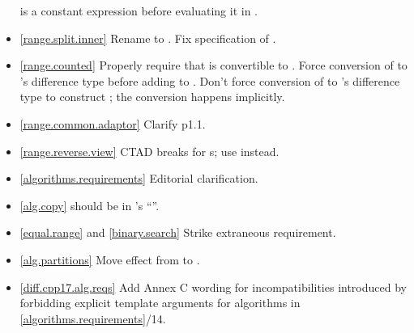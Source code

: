 \begin{itemize}
  is a constant expression before evaluating it in
  .
\item \ref{range.split.inner} Rename  to .
  Fix specification of .
\item \ref{range.counted}
  Properly require that  is convertible to .
  Force conversion of  to 's difference type
  before adding to .
  Don't force conversion of  to 's difference type to
  construct ; the conversion happens implicitly.
\item \ref{range.common.adaptor} Clarify p1.1.
\item \ref{range.reverse.view}  CTAD breaks for
  s; use  instead.
\item \ref{algorithms.requirements} Editorial clarification.
\item \ref{alg.copy}  should be  in
  's ``\returns''.
\item \ref{equal.range} and \ref{binary.search} Strike extraneous requirement.
\item \ref{alg.partitions} Move effect from \returns to \effects.
\item \ref{diff.cpp17.alg.reqs} Add Annex C wording for incompatibilities
  introduced by forbidding explicit template arguments for algorithms in
  \ref{algorithms.requirements}/14.
\end{itemize}


